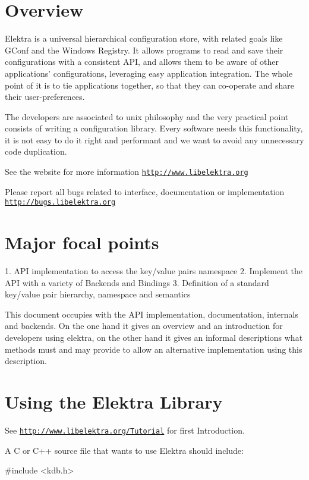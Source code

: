 \hypertarget{index_overview}{}\section{Overview}\label{index_overview}
Elektra is a universal hierarchical configuration store, with related goals like GConf and the Windows Registry. It allows programs to read and save their configurations with a consistent API, and allows them to be aware of other applications' configurations, leveraging easy application integration. The whole point of it is to tie applications together, so that they can co-\/operate and share their user-\/preferences.

The developers are associated to unix philosophy and the very practical point consists of writing a configuration library. Every software needs this functionality, it is not easy to do it right and performant and we want to avoid any unnecessary code duplication.

See the website for more information \href{http://www.libelektra.org}{\tt http://www.libelektra.org}

Please report all bugs related to interface, documentation or implementation \href{http://bugs.libelektra.org}{\tt http://bugs.libelektra.org}\hypertarget{index_focus}{}\section{Major focal points}\label{index_focus}
1. API implementation to access the key/value pairs namespace 2. Implement the API with a variety of Backends and Bindings 3. Definition of a standard key/value pair hierarchy, namespace and semantics

This document occupies with the API implementation, documentation, internals and backends. On the one hand it gives an overview and an introduction for developers using elektra, on the other hand it gives an informal descriptions what methods must and may provide to allow an alternative implementation using this description.\hypertarget{index_using}{}\section{Using the Elektra Library}\label{index_using}
See \href{http://www.libelektra.org/Tutorial}{\tt http://www.libelektra.org/Tutorial} for first Introduction.

A C or C++ source file that wants to use Elektra should include: 
\begin{DoxyCode}
 #include <kdb.h>
\end{DoxyCode}


